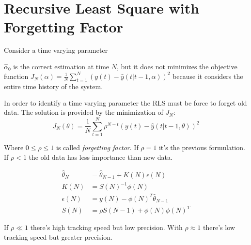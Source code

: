 \section{Recursive Least Square with Forgetting Factor}

Consider a time varying parameter

$\hat{\alpha}_0$ is the correct estimation at time $N$, but it does not minimizes the objective function $J_N(\alpha)= \frac{1}{N} \sum_{t=1}^N \left( y(t) - \hat{y}(t|t-1, \alpha) \right)^2$ because it considers the entire time history of the system.

In order to identify a time varying parameter the RLS must be force to forget old data.
The solution is provided by the minimization of $J_N$:
\[
    J_N(\theta) = \frac{1}{N} \sum_{t=1}^N \rho^{N-t}\left( y(t) - \hat{y}(t|t-1,\theta) \right)^2
\]

Where $0 \le \rho \le 1$ is called \emph{forgetting factor}. If $\rho=1$ it's the previous formulation. If $\rho<1$ the old data has less importance than new data.

\begin{align*}
    \hat{\theta}_N &= \hat{\theta}_{N-1} + K(N)\epsilon(N) \\
    K(N) &= S(N)^{-1}\phi(N) \\
    \epsilon(N) &= y(N) - \phi(N)^T\hat{\theta}_{N-1} \\
    S(N) &= \rho S(N-1) + \phi(N)\phi(N)^T
\end{align*}

\begin{remark}

    If $\rho \ll 1$ there's high tracking speed but low precision. With $\rho \approx 1$ there's low tracking speed but greater precision.
\end{remark}
